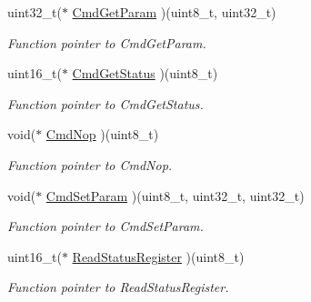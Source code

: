 \begin{DoxyCompactItemize}
uint32\+\_\+t($\ast$ \mbox{\hyperlink{structmotor_drv__t_a8d55886dbf2c2c18fdd01f3028a93c07}{Cmd\+Get\+Param}} )(uint8\+\_\+t, uint32\+\_\+t)
\begin{DoxyCompactList}\small\item\em Function pointer to Cmd\+Get\+Param. \end{DoxyCompactList}\item 
\mbox{\label{structmotor_drv__t_a239f7eaa897de7ec050be6cb4a4e57e4}} 
uint16\+\_\+t($\ast$ \mbox{\hyperlink{structmotor_drv__t_a239f7eaa897de7ec050be6cb4a4e57e4}{Cmd\+Get\+Status}} )(uint8\+\_\+t)
\begin{DoxyCompactList}\small\item\em Function pointer to Cmd\+Get\+Status. \end{DoxyCompactList}\item 
\mbox{\label{structmotor_drv__t_a4e97706460908dfe866adef2d6ee8348}} 
void($\ast$ \mbox{\hyperlink{structmotor_drv__t_a4e97706460908dfe866adef2d6ee8348}{Cmd\+Nop}} )(uint8\+\_\+t)
\begin{DoxyCompactList}\small\item\em Function pointer to Cmd\+Nop. \end{DoxyCompactList}\item 
\mbox{\label{structmotor_drv__t_a77fd8c257b41d770b181d12afa3ef24b}} 
void($\ast$ \mbox{\hyperlink{structmotor_drv__t_a77fd8c257b41d770b181d12afa3ef24b}{Cmd\+Set\+Param}} )(uint8\+\_\+t, uint32\+\_\+t, uint32\+\_\+t)
\begin{DoxyCompactList}\small\item\em Function pointer to Cmd\+Set\+Param. \end{DoxyCompactList}\item 
\mbox{\label{structmotor_drv__t_a2c590c6ec89b777413cfe66e214cb388}} 
uint16\+\_\+t($\ast$ \mbox{\hyperlink{structmotor_drv__t_a2c590c6ec89b777413cfe66e214cb388}{Read\+Status\+Register}} )(uint8\+\_\+t)
\begin{DoxyCompactList}\small\item\em Function pointer to Read\+Status\+Register. \end{DoxyCompactList}\item 
\mbox{\label{structmotor_drv__t_ae50b1207bc65c89404e298b77838d5cd}} 

\end{DoxyCompactItemize}
